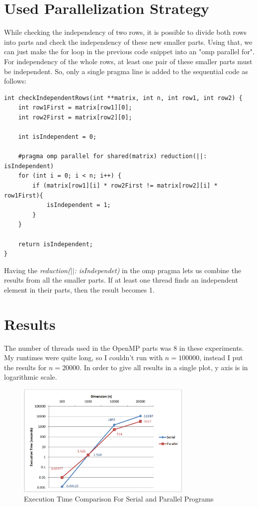 \documentclass{article}
\begin{document}
\section{Used Parallelization Strategy} 

While checking the independency of two rows, it is possible to divide both rows into parts and check the independency of these new smaller parts. Using that, we can just make the for loop in the previous code snippet into an "omp parallel for". For independency of the whole rows, at least one pair of these smaller parts must be independent. So, only  a single pragma line is added to the sequential code as follows:

\begin{lstlisting}
int checkIndependentRows(int **matrix, int n, int row1, int row2) {
	int row1First = matrix[row1][0];
	int row2First = matrix[row2][0];

	int isIndependent = 0;
	
	#pragma omp parallel for shared(matrix) reduction(||: isIndependent)
	for (int i = 0; i < n; i++) {
		if (matrix[row1][i] * row2First != matrix[row2][i] * row1First){
			isIndependent = 1;
		}
	}
	
	return isIndependent;
}
\end{lstlisting}

Having the \emph{reduction($\vert\vert$: isIndependet)} in the omp pragma lets us combine the results from all the smaller parts. If at least one thread finds an independent element in their parts, then the result becomes 1.

\section{Results}

The number of threads used in the OpenMP parts was $8$ in these experiments. My runtimes were quite long, so I couldn't run with $n=100000$, instead I put the results for $n=20000$. In order to give all results in a single plot, y axis is in logarithmic scale. 

\begin{figure}[!htb]
    \centering
    \includegraphics[width=0.75\textwidth]{plot.png}
    \caption{Execution Time Comparison For Serial and Parallel Programs}
\end{figure}
\end{document}
